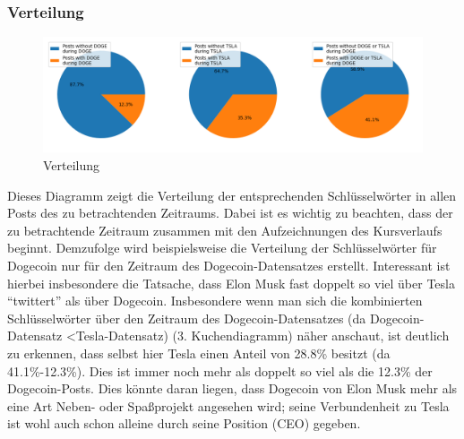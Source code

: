 \documentclass{article}
\begin{document}
\subsubsection{Verteilung}
\begin{figure}[h]
  	\centering
  	\includegraphics[width=\textwidth]{../imgs/Verteilung.png}
 	\caption{Verteilung}
 	\label{fig:Verteilung}
\end{figure}
Dieses Diagramm zeigt die Verteilung der entsprechenden Schlüsselwörter in allen Posts des zu betrachtenden Zeitraums.
Dabei ist es wichtig zu beachten, dass der zu betrachtende Zeitraum zusammen mit den Aufzeichnungen des Kursverlaufs beginnt.
Demzufolge wird beispielsweise die Verteilung der Schlüsselwörter für Dogecoin nur für den Zeitraum des Dogecoin-Datensatzes erstellt.
Interessant ist hierbei insbesondere die Tatsache, dass Elon Musk fast doppelt so viel über Tesla ``twittert'' als über Dogecoin.
Insbesondere wenn man sich die kombinierten Schlüsselwörter über den Zeitraum des Dogecoin-Datensatzes (da Dogecoin-Datensatz \textless Tesla-Datensatz) (3. Kuchendiagramm) näher anschaut, ist deutlich zu erkennen, dass selbst hier Tesla einen Anteil von 28.8\% besitzt (da 41.1\%-12.3\%).
Dies ist immer noch mehr als doppelt so viel als die 12.3\% der Dogecoin-Posts.
Dies könnte daran liegen, dass Dogecoin von Elon Musk mehr als eine Art Neben- oder Spaßprojekt angesehen wird; seine Verbundenheit zu Tesla ist wohl auch schon alleine durch seine Position (CEO) gegeben.
\end{document}
